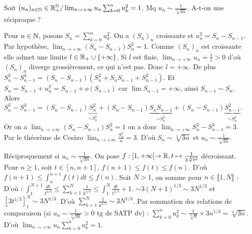 

\begin{statementbox}
Soit $(u_n)_{n \in \mathbb N} \in \mathbb R_+^\mathbb N / \lim_{n \to +\infty} u_n \sum_{k=0}^n u_k^2 = 1$. Mq $u_n \sim \frac{1}{\sqrt[3]{3n}}$. A-t-on une réciproque ?
\end{statementbox}

\begin{solution}
Pour $n \in \mathbb N$, posons $S_n = \sum_{k=0}^n u_k^2$.
On a $(S_n)_n$ croissante et $u_n^2 = S_n - S_{n-1}$. Par hypothèse, $\lim_{n \to +\infty} (S_n - S_{n-1}) S_n^2 = 1$.
Comme $(S_n)_n$ est croissante elle admet une limite $l \in \mathbb R_+ \cup \{+\infty\}$.
Si $l$ est finie, $\lim_{n \to +\infty} u_n = \frac{1}{l} > 0$ d'où $(S_n)_n$ diverge grossièrement, ce qui n'est pas.
Donc $l = +\infty$.
De plus $S_n^3 - S_{n-1}^3 = (S_n - S_{n-1})(S_n^2 + S_n S_{n-1} + S_{n-1}^2)$.
Et $S_n = S_{n-1} + u_n^2 = S_{n-1} + o(S_{n-1})$ car $\lim S_{n-1} = +\infty$, ainsi $S_{n-1} \sim S_n$.
Alors $S_n^3 - S_{n-1}^3 = (S_n - S_{n-1}) \underbrace{S_n^2}_{\sim S_n^2} + (S_n - S_{n-1}) \underbrace{S_n S_{n-1}}_{\sim S_n^2} + (S_n - S_{n-1}) \underbrace{S_{n-1}^2}_{\sim S_n^2}$.
Or on a $\lim_{n \to +\infty} (S_n - S_{n-1}) S_n^2 = 1$ on a donc $\lim_{n \to +\infty} S_n^3 - S_{n-1}^3 = 3$.
Par le théorème de Cesàro $\lim_{n \to +\infty} \frac{S_n^3}{n} = 3$. D'où $S_n \sim \sqrt[3]{3n}$ et $u_n \sim \frac{1}{\sqrt[3]{3n}}$.

Réciproquement si $u_n \sim \frac{1}{\sqrt[3]{3n}}$. On pose $f : [1, +\infty[ \to \mathbb R, t \mapsto \frac{1}{3 \sqrt[3]{t^2}}$ décroissant.
Pour $n \geq 1$, soit $t \in [n, n+1]$, $f(n+1) \leq f(t) \leq f(n)$.
D'où $f(n+1) \leq \int_n^{n+1} f(t) dt \leq f(n)$.
Soit $N > 1$, on somme pour $n \in \llbracket 1, N \rrbracket$ :
D'où : $\int_1^{N+1} \frac{dt}{t^{2/3}} \leq \sum_{k=1}^N \frac{1}{k^{2/3}} \leq \int_1^N \frac{dt}{t^{2/3}} + 1$.
$\sim 3(N+1)^{1/3} \sim 3N^{1/3}$ et $[3t^{1/3}]_1^N \sim 3N^{1/3}$.
D'où $\sum_{k=1}^N \frac{1}{k^{2/3}} \sim 3N^{1/3}$.
Par sommation des relations de comparaison (si $u_n \sim \frac{1}{\sqrt[3]{3n}} > 0$ tg de SATP dv) :
$\sum_{k=0}^n u_k^2 \sim \frac{1}{\sqrt[3]{9}} \times 3 n^{1/3} = \sqrt[3]{3n}$.
D'où $\lim_{n \to +\infty} u_n \sum_{k=0}^n u_k^2 = 1$.


\end{solution}

